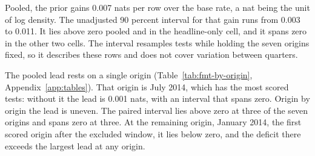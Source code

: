 \begin{table}[t]\centering\scriptsize
\caption{The prior's lead over the base rate on the headline archive under four settings, pooled and by cell. Columns: scored rows; the base rate's log score with its Student-t density (the main run) and with a normal density (an ablation); and P1's log score minus the base rate's in the main run, against the normal base rate, in the realized-traffic diagnostic, which gives each row its own realized traffic, and in the first specification, which combines the normal base rate with that traffic. Intervals are 90 percent bootstrap by test, unadjusted, and hold the fitted models and the set of quarters fixed (Table~\ref{tab:fmt-by-origin} gives the interval with the origins as units). The density changes the base rate's log score alone, and the exposure changes the prior's alone, since the base rate reads no exposure.}
\label{tab:fmt-base-density}
\resizebox{\columnwidth}{!}{%
}
\end{table}

Pooled, the prior gains 0.007 nats per row over the base rate, a nat being the unit of log density. The unadjusted 90 percent interval for that gain runs from 0.003 to 0.011. It lies above zero pooled and in the headline-only cell, and it spans zero in the other two cells. The interval resamples tests while holding the seven origins fixed, so it describes these rows and does not cover variation between quarters.

The pooled lead rests on a single origin (Table~\ref{tab:fmt-by-origin}, Appendix~\ref{app:tables}). That origin is July 2014, which has the most scored tests: without it the lead is 0.001 nats, with an interval that spans zero. Origin by origin the lead is uneven. The paired interval lies above zero at three of the seven origins and spans zero at three. At the remaining origin, January 2014, the first scored origin after the excluded window, it lies below zero, and the deficit there exceeds the largest lead at any origin.

